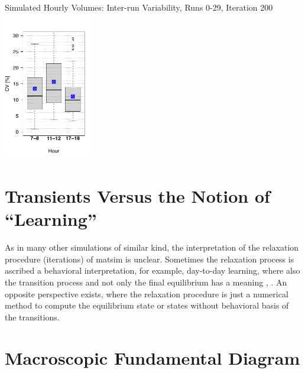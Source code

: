 {	{\label{fig:linkVolumesHour17-18InterScatter}}%
  {}%
	\createsubfigure%
  {Simulated Hourly Volumes: Inter-run Variability, Runs 0-29, Iteration 200}%
	{\includegraphics[width=0.3\textwidth]{understanding/figures/var/linkVolumesInter200.pdf}}%
	{\label{fig:linkVolumesInter200}}%
  {}%
}%
{} 

\vfill\eject
\section{Transients Versus the Notion of ``Learning''}
\label{sec:transients-vs-learning}

As in many other simulations of similar kind, the interpretation of the relaxation procedure (iterations) of \gls{matsim} is unclear. 
%
Sometimes the relaxation process is ascribed a behavioral interpretation, for example, day-to-day learning, where also the transition process and not only the final equilibrium has a meaning \citep[][p.128]{LiuEtAl_TransResA_2006}, \citep[][p.523]{NagelBarrett1997feedback}. 
%
An opposite perspective exists, where the relaxation procedure is just a numerical method to compute the equilibrium state or states without behavioral basis of the transitions.


\vfill\eject
\section{Macroscopic Fundamental Diagram}
\label{sec:researchavenues-mfd}


\vfill\eject
